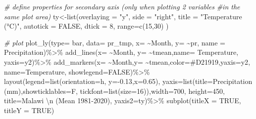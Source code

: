 \documentclass[
]{book}
\newenvironment{Shaded}{\begin{snugshade}}{\end{snugshade}}
\newcommand{\AttributeTok}[1]{\textcolor[rgb]{0.77,0.63,0.00}{#1}}
\newcommand{\CommentTok}[1]{\textcolor[rgb]{0.56,0.35,0.01}{\textit{#1}}}
\newcommand{\ConstantTok}[1]{\textcolor[rgb]{0.00,0.00,0.00}{#1}}
\newcommand{\DecValTok}[1]{\textcolor[rgb]{0.00,0.00,0.81}{#1}}
\newcommand{\FloatTok}[1]{\textcolor[rgb]{0.00,0.00,0.81}{#1}}
\newcommand{\FunctionTok}[1]{\textcolor[rgb]{0.00,0.00,0.00}{#1}}
\newcommand{\NormalTok}[1]{#1}
\newcommand{\OtherTok}[1]{\textcolor[rgb]{0.56,0.35,0.01}{#1}}
\newcommand{\SpecialCharTok}[1]{\textcolor[rgb]{0.00,0.00,0.00}{#1}}
\newcommand{\StringTok}[1]{\textcolor[rgb]{0.31,0.60,0.02}{#1}}
\begin{document}
\begin{Shaded}
\begin{Highlighting}[]
\CommentTok{\# define properties for secondary axis (only when plotting 2 variables }
\CommentTok{\#in the same plot area)}
\NormalTok{ty}\OtherTok{\textless{}{-}}\FunctionTok{list}\NormalTok{(}\AttributeTok{overlaying =} \StringTok{"y"}\NormalTok{,}
  \AttributeTok{side =} \StringTok{"right"}\NormalTok{,}
  \AttributeTok{title =} \StringTok{"Temperature (°C)"}\NormalTok{,}
  \AttributeTok{autotick =} \ConstantTok{FALSE}\NormalTok{,}
      \AttributeTok{dtick =} \DecValTok{8}\NormalTok{,}
 \AttributeTok{range=}\FunctionTok{c}\NormalTok{(}\DecValTok{15}\NormalTok{,}\DecValTok{30}\NormalTok{)}
\NormalTok{  )}

\CommentTok{\# plot }
\FunctionTok{plot\_ly}\NormalTok{(}\AttributeTok{type=} \StringTok{\textquotesingle{}bar\textquotesingle{}}\NormalTok{, }\AttributeTok{data=}\NormalTok{ pr\_tmp, }\AttributeTok{x=} \SpecialCharTok{\textasciitilde{}}\NormalTok{Month, }\AttributeTok{y=} \SpecialCharTok{\textasciitilde{}}\NormalTok{pr, }\AttributeTok{name =} \StringTok{\textquotesingle{}Precipitation\textquotesingle{}}\NormalTok{)}\SpecialCharTok{\%\textgreater{}\%}
 \FunctionTok{add\_lines}\NormalTok{(}\AttributeTok{x=} \SpecialCharTok{\textasciitilde{}}\NormalTok{Month, }\AttributeTok{y=} \SpecialCharTok{\textasciitilde{}}\NormalTok{tmean,}\AttributeTok{name=} \StringTok{\textquotesingle{}Temperature\textquotesingle{}}\NormalTok{, }\AttributeTok{yaxis=}\StringTok{\textquotesingle{}y2\textquotesingle{}}\NormalTok{)}\SpecialCharTok{\%\textgreater{}\%}
  \FunctionTok{add\_markers}\NormalTok{(}\AttributeTok{x=} \SpecialCharTok{\textasciitilde{}}\NormalTok{Month,}\AttributeTok{y=} \SpecialCharTok{\textasciitilde{}}\NormalTok{tmean,}\AttributeTok{color=}\StringTok{\textquotesingle{}\#D21919\textquotesingle{}}\NormalTok{,}\AttributeTok{yaxis=}\StringTok{\textquotesingle{}y2\textquotesingle{}}\NormalTok{, }\AttributeTok{name=}\StringTok{\textquotesingle{}Temperature\textquotesingle{}}\NormalTok{, }
              \AttributeTok{showlegend=}\ConstantTok{FALSE}\NormalTok{)}\SpecialCharTok{\%\textgreater{}\%}
    \FunctionTok{layout}\NormalTok{(}\AttributeTok{legend=}\FunctionTok{list}\NormalTok{(}\AttributeTok{orientation=}\StringTok{\textquotesingle{}h\textquotesingle{}}\NormalTok{, }\AttributeTok{y=}\SpecialCharTok{{-}}\FloatTok{0.13}\NormalTok{,}\AttributeTok{x=}\FloatTok{0.65}\NormalTok{), }
           \AttributeTok{yaxis=}\FunctionTok{list}\NormalTok{(}\AttributeTok{title=}\StringTok{\textquotesingle{}Precipitation (mm)\textquotesingle{}}\NormalTok{,}\AttributeTok{showticklables=}\NormalTok{F,}
                      \AttributeTok{tickfont=}\FunctionTok{list}\NormalTok{(}\AttributeTok{size=}\DecValTok{16}\NormalTok{)),}\AttributeTok{width=}\DecValTok{700}\NormalTok{, }\AttributeTok{height=}\DecValTok{450}\NormalTok{, }
           \AttributeTok{title=}\StringTok{\textquotesingle{}Malawi }\SpecialCharTok{\textbackslash{}n}\StringTok{ (Mean 1981{-}2020)\textquotesingle{}}\NormalTok{, }\AttributeTok{yaxis2=}\NormalTok{ty)}\SpecialCharTok{\%\textgreater{}\%}
  \FunctionTok{subplot}\NormalTok{(}\AttributeTok{titleX =} \ConstantTok{TRUE}\NormalTok{, }\AttributeTok{titleY =} \ConstantTok{TRUE}\NormalTok{)}
\end{Highlighting}
\end{Shaded}
\end{document}

